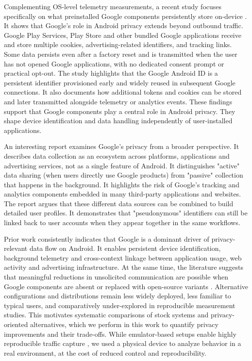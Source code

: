 Complementing OS-level telemetry measurements, a recent study focuses specifically on what preinstalled Google components persistently store on-device \cite{cookies-identifiers2025}. It shows that Google’s role in Android privacy extends beyond outbound traffic. Google Play Services, Play Store and other bundled Google applications receive and store multiple cookies, advertising-related identifiers, and tracking links. Some data persists even after a factory reset and is transmitted when the user has not opened Google applications, with no dedicated consent prompt or practical opt-out. The study highlights that the Google Android ID is a persistent identifier provisioned early and widely reused in subsequent Google connections. It also documents how additional tokens and cookies can be stored and later transmitted alongside telemetry or analytics events. These findings support that Google components play a central role in Android privacy. They shape device identification and data handling independently of user-installed applications.

An interesting report \cite{google-data-collection2018} examines Google's privacy from a broader perspective. It describes data collection as an ecosystem across platforms, applications and advertising services, not as a single feature of Android. It distinguishes "active" data sharing (when users directly use Google products) from "passive" collection that happens in the background. It highlights the risk of Google's tracking and analytics components embedded in many third-party applications and websites. The report argues that these different data sources can be combined to build detailed user profiles. It demonstrates that "pseudonymous" identifiers can still be linked back to user accounts when they appear together in the same workflows.

Prior work consistently indicates that Google is a dominant driver of privacy-relevant data flow on Android. It enables persistent device identification, background telemetry and cross-context linkage between application usage, web activity and advertising infrastructure. At the same time, the literature suggests that meaningful reductions in unsolicited communication are possible when Google components are absent or replaced with open-source variants \cite{android-os-snooping2021}. Alternative configurations and distributions remain less widely deployed, less familiar to typical users, and comparatively under-explored in reproducible measurement studies. This motivates systematic comparisons of stock systems and privacy-oriented alternatives, which we perform in this work to quantify privacy improvements and their trade-offs. While emulator-based setups enable highly reproducible traffic capture \cite{parrot2025}, we used a physical device to analyze behavior in a real environment, at the cost of reduced control and reproducibility.